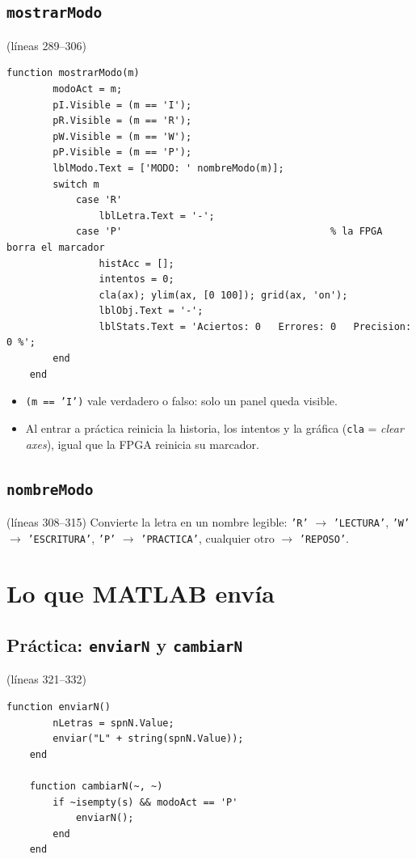 \documentclass[11pt,a4paper]{article}
\newcommand{\linea}[1]{\textcolor{gris}{\small(líneas #1)}}
\newcommand{\cod}[1]{\texttt{#1}}
\begin{document}
\subsection{\texttt{mostrarModo}}
\linea{289--306}
\begin{lstlisting}[firstnumber=289]
    function mostrarModo(m)
        modoAct = m;
        pI.Visible = (m == 'I');
        pR.Visible = (m == 'R');
        pW.Visible = (m == 'W');
        pP.Visible = (m == 'P');
        lblModo.Text = ['MODO: ' nombreModo(m)];
        switch m
            case 'R'
                lblLetra.Text = '-';
            case 'P'                                    % la FPGA borra el marcador
                histAcc = [];
                intentos = 0;
                cla(ax); ylim(ax, [0 100]); grid(ax, 'on');
                lblObj.Text = '-';
                lblStats.Text = 'Aciertos: 0   Errores: 0   Precision: 0 %';
        end
    end
\end{lstlisting}
\begin{itemize}
  \item \cod{(m == 'I')} vale verdadero o falso: solo un panel queda visible.
  \item Al entrar a práctica reinicia la historia, los intentos y la gráfica
        (\cod{cla} = \emph{clear axes}), igual que la FPGA reinicia su marcador.
\end{itemize}

\subsection{\texttt{nombreModo}}
\linea{308--315}
Convierte la letra en un nombre legible: \cod{'R'} $\rightarrow$ \cod{'LECTURA'},
\cod{'W'} $\rightarrow$ \cod{'ESCRITURA'}, \cod{'P'} $\rightarrow$ \cod{'PRACTICA'},
cualquier otro $\rightarrow$ \cod{'REPOSO'}.

\section{Lo que MATLAB envía}

\subsection{Práctica: \texttt{enviarN} y \texttt{cambiarN}}
\linea{321--332}
\begin{lstlisting}[firstnumber=321]
    function enviarN()
        nLetras = spnN.Value;
        enviar("L" + string(spnN.Value));
    end

    function cambiarN(~, ~)
        if ~isempty(s) && modoAct == 'P'
            enviarN();
        end
    end
\end{lstlisting}
\end{document}
